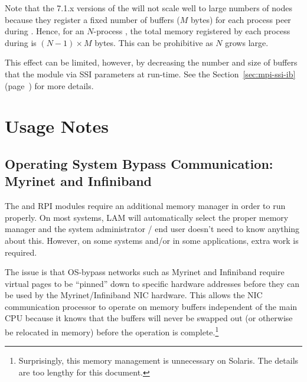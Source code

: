 
Note that the 7.1.x versions of the   will not scale
well to large numbers of nodes because they register a fixed number of
buffers ($M$ bytes) for each process peer during
.  Hence, for an $N$-process
, the total memory registered by each
process during  is $(N - 1) \times M$ bytes.
This can be prohibitive as $N$ grows large.

This effect can be limited, however, by decreasing the number and size
of buffers that the   module via SSI parameters at
run-time.  See the Section~\ref{sec:mpi-ssi-ib}
(page~\pageref{sec:mpi-ssi-ib}) for more details.




\section{Usage Notes}



\subsection{Operating System Bypass Communication: Myrinet and
  Infiniband}
\label{release-notes:os-bypass}

The  and  RPI modules require an additional memory
manager in order to run properly.  On most systems, LAM will
automatically select the proper memory manager and the system
administrator / end user doesn't need to know anything about this.
However, on some systems and/or in some applications, extra work is
required.

The issue is that OS-bypass networks such as Myrinet and Infiniband
require virtual pages to be ``pinned'' down to specific hardware
addresses before they can be used by the Myrinet/Infiniband NIC
hardware.  This allows the NIC communication processor to operate on
memory buffers independent of the main CPU because it knows that the
buffers will never be swapped out (or otherwise be relocated in
memory) before the operation is complete.\footnote{Surprisingly, this
  memory management is unnecessary on Solaris.  The details are too
  lengthy for this document.}

